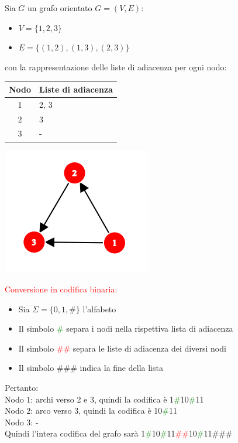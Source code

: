 \documentclass{article}  %
\theoremstyle{definition}
\begin{document}
\begin{esempio}
	\footnotesize
	Sia $G$ un grafo orientato $G=(V,E)$:
	\begin{itemize}
		\item $V = \{1, 2, 3\}$
		\item $E = \{(1,2), (1,3), (2,3)\}$
	\end{itemize}
	con la rappresentazione delle liste di adiacenza per ogni nodo: \\
	\begin{tabular}{c | l}
		\textbf{Nodo} & \textbf{Liste di adiacenza} \\ \hline
		1             & 2, 3                        \\
		2             & 3                           \\
		3             & -
	\end{tabular}
	\begin{center}
		\includegraphics[width=0.3\linewidth]{graph1.png}
	\end{center}
	\textcolor{red}{Conversione in codifica binaria:}
	\begin{itemize}
		\item Sia $\Sigma = \{0, 1, \#\}$ l'alfabeto
		\item Il simbolo \textcolor{green}{$\#$} separa i nodi nella rispettiva lista di adiacenza
		\item Il simbolo \textcolor{red}{$\#\#$} separa le liste di adiacenza dei diversi nodi
		\item Il simbolo $\#\#\#$ indica la fine della lista
	\end{itemize}
	Pertanto: \\
	Nodo $1$: archi verso 2 e 3, quindi la codifica è 1\textcolor{green}{\#}10\textcolor{green}{$\#$}11\\
	Nodo $2$: arco verso 3, quindi la codifica è 10\textcolor{green}{$\#$}11\\
	Nodo 3: - \\
	Quindi l'intera codifica del grafo sarà 1\textcolor{green}{\#}10\textcolor{green}{$\#$}11\textcolor{red}{$\#\#$}10\textcolor{green}{$\#$}11\#\#\#
\end{esempio}
\end{document}
